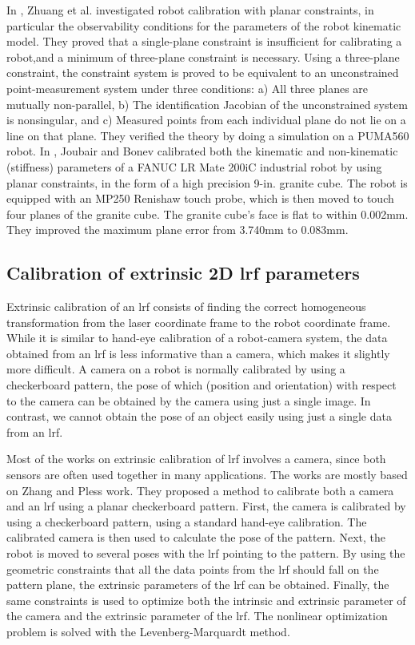 In \cite{Zhuang1999}, Zhuang et al. investigated robot calibration with planar constraints, in particular the observability conditions for the parameters of the robot kinematic model. They proved that a single-plane constraint is insufficient for calibrating a robot,and a minimum of three-plane constraint is necessary. Using a three-plane constraint, the constraint system is proved to be equivalent to an unconstrained point-measurement system under three conditions: a) All three planes are mutually non-parallel, b) The identification Jacobian of the unconstrained system is nonsingular, and c) Measured points from each individual plane do not lie on a line on that plane. They verified the theory by doing a simulation on a PUMA560 robot. 
In \cite{Joubair2015}, Joubair and Bonev calibrated both the kinematic and non-kinematic (stiffness) parameters of a FANUC LR Mate 200iC industrial robot by using planar constraints, in the form of a high precision 9-in. granite cube. The robot is equipped with an MP250 Renishaw touch probe, which is then moved to touch four planes of the granite cube. The granite cube's face is flat to within 0.002mm. They improved the maximum plane error from 3.740mm to 0.083mm. 

\subsection{Calibration of extrinsic 2D \ac{lrf} parameters}
\label{sec:laser_calib}
Extrinsic calibration of an \ac{lrf} consists of finding the correct homogeneous transformation from the laser coordinate frame to the robot coordinate frame. While it is similar to hand-eye calibration of a robot-camera system, the data obtained from an \ac{lrf} is less informative than a camera, which makes it slightly more difficult. A camera on a robot is normally calibrated by using a checkerboard pattern, the pose of which (position and orientation) with respect to the camera can be obtained by the camera using just a single image. In contrast, we cannot obtain the pose of an object easily using just a single data from an \ac{lrf}. 

Most of the works on extrinsic calibration of \ac{lrf} involves a camera, since both sensors are often used together in many applications. The works are mostly based on Zhang and Pless work\cite{Zhang2004}. They proposed a method to calibrate both a camera and an \ac{lrf} using a planar checkerboard pattern. First, the camera is calibrated by using a checkerboard pattern, using a standard hand-eye calibration. The calibrated camera is then used to calculate the pose of the pattern. Next, the robot is moved to several poses with the \ac{lrf} pointing to the pattern. By using the geometric constraints that all the data points from the \ac{lrf} should fall on the pattern plane, the extrinsic parameters of the \ac{lrf} can be obtained. Finally, the same constraints is used to optimize both the intrinsic and extrinsic parameter of the camera and the extrinsic parameter of the \ac{lrf}. The nonlinear optimization problem is solved with the Levenberg-Marquardt method.


